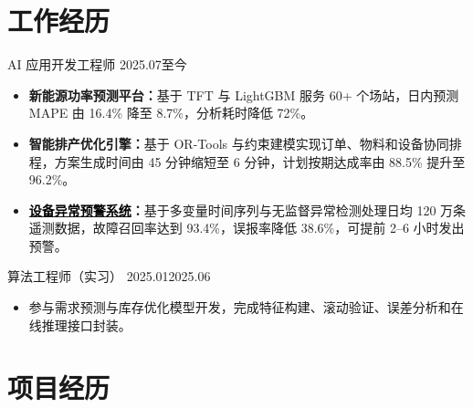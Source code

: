 \documentclass{claritycv}
\begin{document}
\section{工作经历}

  {AI 应用开发工程师}
  {2025.07}{至今}
\begin{itemize}
  \item \textbf{新能源功率预测平台：}基于 TFT 与 LightGBM 服务 60+ 个场站，日内预测 MAPE 由 16.4\% 降至 8.7\%，分析耗时降低 72\%。
  \item \textbf{智能排产优化引擎：}基于 OR-Tools 与约束建模实现订单、物料和设备协同排程，方案生成时间由 45 分钟缩短至 6 分钟，计划按期达成率由 88.5\% 提升至 96.2\%。
  \item \textbf{\hyperlink{proj-monitoring}{\textcolor{black}{设备异常预警系统}}：}基于多变量时间序列与无监督异常检测处理日均 120 万条遥测数据，故障召回率达到 93.4\%，误报率降低 38.6\%，可提前 2--6 小时发出预警。
\end{itemize}

  {算法工程师（实习）}
  {2025.01}{2025.06}
\begin{itemize}
  \item 参与需求预测与库存优化模型开发，完成特征构建、滚动验证、误差分析和在线推理接口封装。
\end{itemize}

\section{项目经历}

\end{document}
